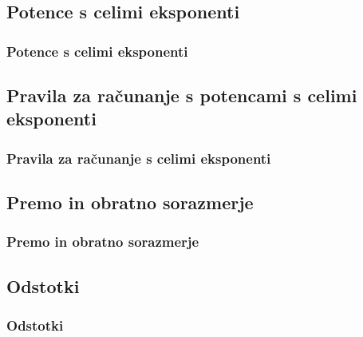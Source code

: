 

    \subsection{Potence s celimi eksponenti}

        \begin{frame}
            \frametitle{Potence s celimi eksponenti}
        \end{frame}



    \subsection{Pravila za računanje s potencami s celimi eksponenti}

        \begin{frame}
            \frametitle{Pravila za računanje s celimi eksponenti}
        \end{frame}

    \subsection{Premo in obratno sorazmerje}

        \begin{frame}
            \frametitle{Premo in obratno sorazmerje}
        \end{frame}

    \subsection{Odstotki}

        \begin{frame}
            \frametitle{Odstotki}
        \end{frame}
